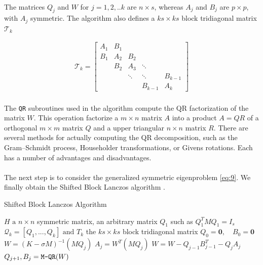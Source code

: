 \paragraph*{}
The matrices $Q_j$ and $W$ for $j=1,2,..k$ are $n \times s$, whereas $A_j$ and $B_j$ are $p\times p$, with $A_j$ symmetric. The algorithm also defines a $ks\times ks$ block tridiagonal matrix $\mathcal{T}_k$

\begin{align*}
    \mathcal{T}_k = 
    \begin{bmatrix}
    A_1 & B_1   &       &           &           \\
    B_1 & A_2   & B_2   &           &           \\
        & B_2   & A_3   & \ddots    &           \\
        &       & \ddots& \ddots    & B_{k-1}   \\
        &       &       & B_{k-1}   & A_{k}
  \end{bmatrix}
\end{align*}

\paragraph*{}
The \texttt{QR} subroutines used in the algorithm compute the QR factorization of the matrix $W$. This operation factorize a $m \times n$ matrix $A$ into a product $A=QR$ of a orthogonal $m \times m$ matrix $Q$ and a upper triangular $n\times n$ matrix $R$. There are several methods for actually computing the QR decomposition, such as the Gram–Schmidt process, Householder transformations\cite{Householder1958}, or Givens rotations. Each has a number of advantages and disadvantages.

\paragraph*{}
The next step is to consider the generalized symmetric eigenproblem \eqref{eq:9}. We finally obtain the Shifted Block Lanczos algorithm \cite{Grimes1994}.

\begin{algorithm}
\caption{Shifted Block Lanczos Algorithm}\label{alg:shifted_block_lanczos}
\begin{algorithmic}[1]
\Require $H \text{ a } n\times n $ symmetric matrix, an arbitrary matrix $Q_1$ such as $Q_1^TMQ_1 = I_s$
\Ensure $ \mathcal{Q}_k=[Q_1,...,Q_k] \text{ and } T_k$ the $ks\times ks$ block tridiagonal matrix
\State $Q_0 = \mathbf{0}, \quad B_0 = \mathbf{0}$
    \State $W = (K-\sigma M)^{-1}(MQ_j)$
    \State $A_j = W^T (M Q_j)$
    \State $W = W - Q_{j-1}B_{j-1}^T - Q_j A_j$
    \State $Q_{j+1}, B_{j} = \text{\texttt{M-QR}}(W)$ 
\EndFor
\end{algorithmic}
\end{algorithm}

